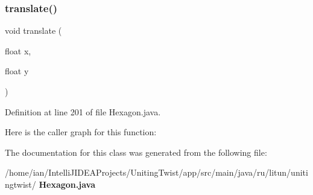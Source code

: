\subsubsection{translate()}
{\footnotesize\ttfamily void translate (\begin{DoxyParamCaption}\item[{float}]{x,  }\item[{float}]{y }\end{DoxyParamCaption})}



Definition at line 201 of file Hexagon.\+java.

Here is the caller graph for this function\+:


The documentation for this class was generated from the following file\+:\begin{DoxyCompactItemize}
\item 
/home/ian/\+Intelli\+J\+I\+D\+E\+A\+Projects/\+Uniting\+Twist/app/src/main/java/ru/litun/unitingtwist/\textbf{ Hexagon.\+java}\end{DoxyCompactItemize}
